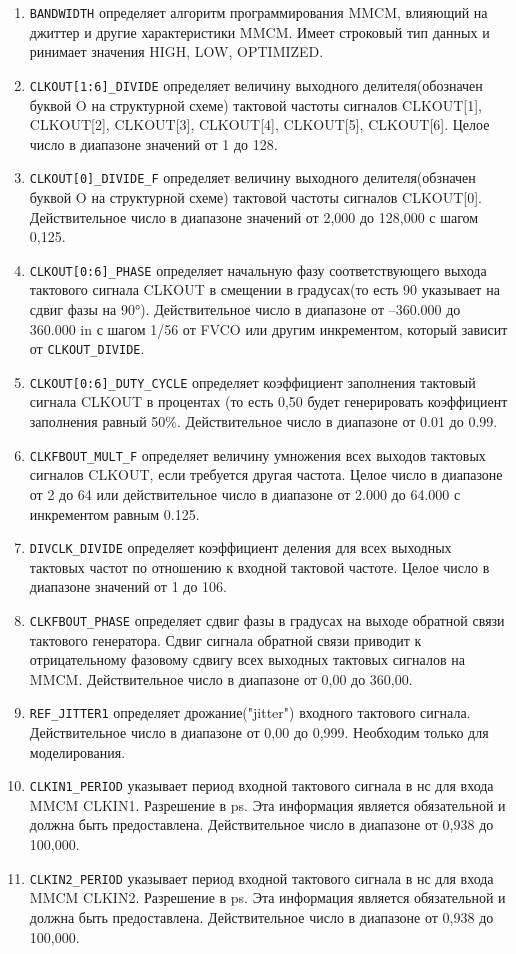 \documentclass[a4paper,oneside ,14pt]{extreport}
\begin{document}
\begin{enumerate}
	\item \verb|BANDWIDTH| определяет алгоритм программирования MMCM, влияющий на джиттер и другие характеристики MMCM. Имеет строковый тип данных и ринимает значения HIGH, LOW, OPTIMIZED.		
	\item \verb|CLKOUT[1:6]_DIVIDE|	 
	определяет величину выходного делителя(обозначен буквой O на структурной схеме) 
	тактовой частоты сигналов CLKOUT[1], CLKOUT[2], CLKOUT[3], CLKOUT[4], CLKOUT[5], CLKOUT[6]. 
	Целое число в диапазоне значений от 1 до 128.
	\item \verb|CLKOUT[0]_DIVIDE_F| определяет величину выходного делителя(обзначен буквой O на структурной схеме) тактовой частоты сигналов CLKOUT[0]. Действительное число в диапазоне значений от 2,000 до 128,000 с шагом 0,125. 	
	\item \verb|CLKOUT[0:6]_PHASE| определяет начальную фазу соответствующего выхода тактового сигнала CLKOUT в смещении в градусах(то есть 90 указывает на сдвиг фазы на 90°). Действительное число в диапазоне от –360.000 до 360.000 in
с шагом 1/56 от FVCO или другим инкрементом, который зависит от \verb|CLKOUT_DIVIDE|.
	\item \verb|CLKOUT[0:6]_DUTY_CYCLE| определяет коэффициент заполнения тактовый сигнала CLKOUT в процентах (то есть 0,50 будет генерировать коэффициент заполнения равный 50\%. Действительное число в диапазоне от 0.01 до 0.99. 
	\item \verb|CLKFBOUT_MULT_F| определяет величину умножения всех выходов тактовых сигналов CLKOUT, если требуется другая частота. Целое число в диапазоне от 2 до 64 или действительное число в диапазоне от 2.000 до 64.000 с инкрементом равным 0.125. 
	\item \verb|DIVCLK_DIVIDE| определяет коэффициент деления для всех выходных тактовых частот по отношению к входной тактовой частоте. Целое число в диапазоне значений от 1 до 106.	
	\item \verb|CLKFBOUT_PHASE| определяет сдвиг фазы в градусах на выходе обратной связи тактового генератора. Сдвиг сигнала обратной связи приводит к отрицательному фазовому сдвигу всех выходных тактовых сигналов на MMCM. Действительное число в диапазоне от 0,00 до 360,00.
	\item \verb|REF_JITTER1| определяет дрожание("jitter") входного тактового сигнала. Действительное число в диапазоне от 0,00 до 0,999.
	Необходим только для моделирования.
	\item \verb|CLKIN1_PERIOD| указывает период входной тактового сигнала в нс для входа MMCM CLKIN1. Разрешение в ps. Эта информация является обязательной и должна быть предоставлена. Действительное число в диапазоне от 0,938 до 100,000. 		
	\item \verb|CLKIN2_PERIOD| указывает период входной тактового сигнала в нс для входа MMCM CLKIN2. Разрешение в ps. Эта информация является обязательной и должна быть предоставлена. Действительное число в диапазоне от 0,938 до 100,000.	
\end{enumerate}
\end{document}
